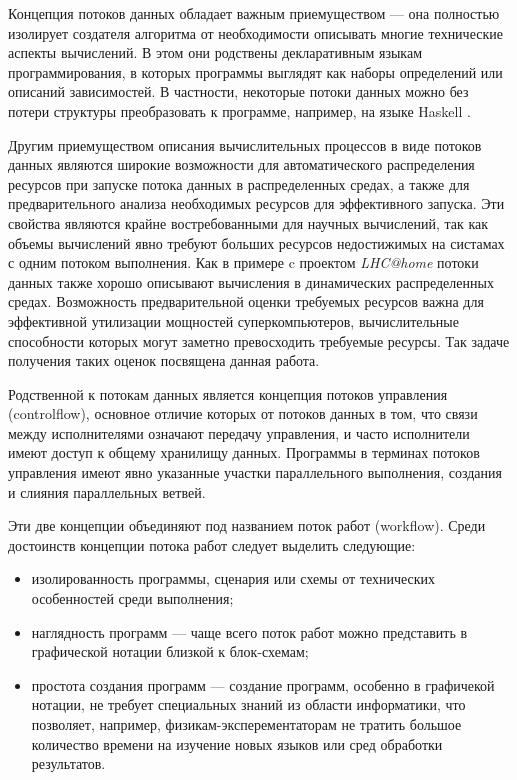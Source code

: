 \documentclass[10pt,a4paper]{article}
\begin{document}
Концепция потоков данных обладает важным приемуществом --- она полностью изолирует создателя алгоритма от необходимости описывать многие
технические аспекты вычислений. В этом они родствены декларативным языкам программирования, в которых программы выглядят как наборы определений или описаний зависимостей.
В частности, некоторые потоки данных можно без потери структуры преобразовать к программе, например, на языке Haskell \cite{data-flow-process-networks}.

Другим приемуществом описания вычислительных процессов в виде потоков данных являются широкие возможности для автоматического
распределения ресурсов при запуске потока данных в распределенных средах, а также для предварительного анализа необходимых ресурсов для эффективного запуска.
Эти свойства являются крайне востребованными для научных вычислений, так как объемы вычислений явно требуют больших ресурсов недостижимых на систамах с одним потоком выполнения.
Как в примере c проектом \textit{LHC@home} потоки данных также хорошо описывают вычисления в динамических распределенных средах.
Возможность предварительной оценки требуемых ресурсов важна для эффективной утилизации мощностей суперкомпьютеров,
вычислительные способности которых могут заметно превосходить требуемые ресурсы. Так задаче получения таких оценок посвящена данная работа.

Родственной к потокам данных является концепция потоков управления (controlflow), основное отличие которых от потоков данных в том, что связи между исполнителями
означают передачу управления, и часто исполнители имеют доступ к общему хранилищу данных. Программы в терминах потоков управления имеют явно указанные
участки параллельного выполнения, создания и слияния параллельных ветвей.

Эти две концепции объединяют под названием поток работ (workflow).
Среди достоинств концепции потока работ следует выделить следующие:
\begin{itemize}
  \item изолированность программы, сценария или схемы от технических особенностей среди выполнения;
  \item наглядность программ --- чаще всего поток работ можно представить в графической нотации близкой к блок-схемам;
  \item простота создания программ --- создание программ, особенно в графичекой нотации, не требует специальных знаний из области информатики,
        что позволяет, например, физикам-эксперементаторам не тратить большое количество времени на изучение новых языков или сред обработки результатов.
\end{itemize}
\end{document}
